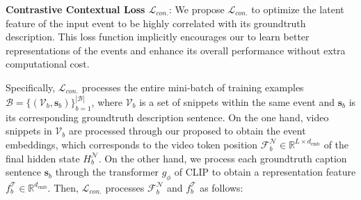 \documentclass[letterpaper]{article} \usepackage{aaai23}  \usepackage{times}  \usepackage{helvet}  \usepackage{courier}  \usepackage[hyphens]{url}  \usepackage{graphicx} \urlstyle{rm} \def\UrlFont{\rm}  \usepackage{natbib}  \usepackage{caption} \frenchspacing  \setlength{\pdfpagewidth}{8.5in}  \setlength{\pdfpageheight}{11in}  \usepackage{algorithm}
\begin{document}
\begin{table*}[!ht]
\centering
\caption{Performance comparison of \model with other SOTA models on ActivityNet Captions \textit{ae-test}. $\dag$ denotes results by us.} 
\label{tab:anet_test}
\end{table*}

\noindent\textbf{Contrastive Contextual Loss $\mathcal{L}_{con.}$}:
We propose $\mathcal{L}_{con.}$ to optimize the latent feature of the input event to be highly correlated with its groundtruth description. This loss function implicitly encourages our \model to learn better representations of the events and enhance its overall performance without extra computational cost. 

Specifically, $\mathcal{L}_{con.}$ processes the entire mini-batch of training examples $\mathcal{B}=\{(\mathcal{V}_b, \textbf{s}_b)\}_{b=1}^{|\mathcal{B}|}$, where $\mathcal{V}_b$ is a set of snippets within the same event and $\textbf{s}_b$ is its corresponding groundtruth description sentence. 
On the one hand, video snippets in $\mathcal{V}_b$ are processed through our proposed \model to obtain the event embeddings, which corresponds to the video token position $\mathcal{F}^{\mathcal{N}}_b\in \mathbb{R}^{L\times d_\text{emb}}$ of the final hidden state $H_b^{\mathcal{N}}$. On the other hand, we process each groundtruth caption sentence $\textbf{s}_b$ through the transformer $g_\phi$ of CLIP \cite{radford2021learning} to obtain a representation feature $f^\mathcal{T}_b \in \mathbb{R}^{d_\text{emb}}$. Then, $\mathcal{L}_{con.}$ processes $\mathcal{F}^{\mathcal{N}}_b$ and $f^\mathcal{T}_b$ as follows:
\end{document}
